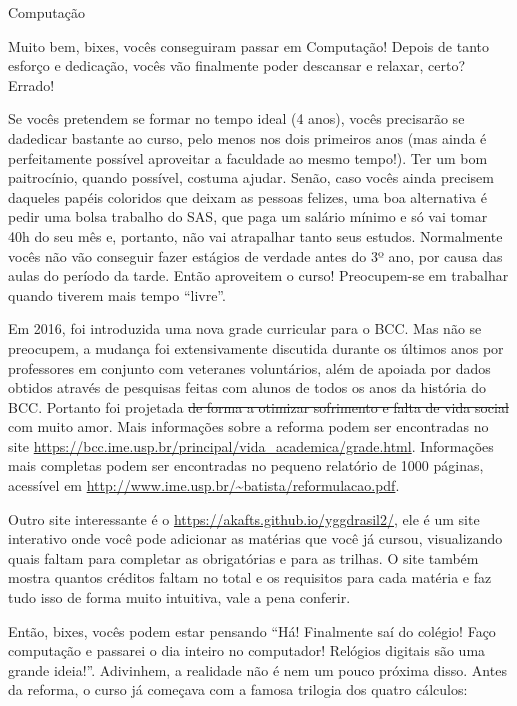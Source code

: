 \begin{subsecao}{Computação}

Muito bem, bixes, vocês conseguiram passar em Computação! Depois de tanto
esforço e dedicação, vocês vão finalmente poder descansar e relaxar, certo?
Errado!

Se vocês pretendem se formar no tempo ideal (4 anos), vocês precisarão se
dadedicar bastante ao curso, pelo menos nos dois primeiros anos (mas ainda é
perfeitamente possível aproveitar a faculdade ao mesmo tempo!). Ter um bom
paitrocínio, quando possível, costuma ajudar. Senão, caso vocês ainda precisem
daqueles papéis coloridos que deixam as pessoas felizes, uma boa alternativa é
pedir uma bolsa trabalho do SAS, que paga um salário mínimo e só vai tomar
40h do seu mês e, portanto, não vai atrapalhar tanto seus estudos. Normalmente
vocês não vão conseguir fazer estágios de verdade antes do 3º ano, por causa
das aulas do período da tarde. Então aproveitem o curso! Preocupem-se em
trabalhar quando tiverem mais tempo ``livre''.

Em 2016, foi introduzida uma nova grade curricular para o
BCC. Mas não se preocupem, a
mudança foi extensivamente discutida durante os últimos anos por professores em
conjunto com veteranes voluntários, além de apoiada por dados obtidos através de
pesquisas feitas com alunos de todos os anos da história do BCC. Portanto foi
projetada \sout{de forma a otimizar sofrimento e falta de vida social} com muito
amor. Mais informações sobre a reforma podem ser encontradas no site
\url{https://bcc.ime.usp.br/principal/vida_academica/grade.html}. Informações mais
completas podem ser encontradas no pequeno relatório de 1000 páginas, acessível em
\url{http://www.ime.usp.br/~batista/reformulacao.pdf}.

Outro site interessante é o \url{https://akafts.github.io/yggdrasil2/}, ele é um
site interativo onde você pode adicionar as matérias que você já cursou, visualizando
quais faltam para completar as obrigatórias e para as trilhas. O site também mostra
quantos créditos faltam no total e os requisitos para cada matéria e faz tudo isso
de forma muito intuitiva, vale a pena conferir.

Então, bixes, vocês podem estar pensando ``Há! Finalmente saí do colégio! Faço
computação e passarei o dia inteiro no computador! Relógios digitais são uma
grande ideia!''. Adivinhem, a realidade não é nem um pouco próxima disso. Antes
da reforma, o curso já começava com a famosa trilogia dos quatro cálculos:


\end{subsecao}
